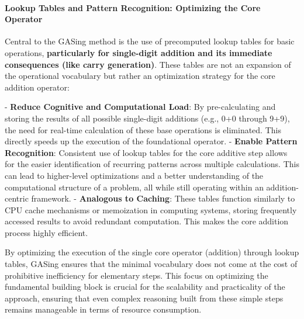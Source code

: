 \paragraph{Lookup Tables and Pattern Recognition: Optimizing the Core Operator}

Central to the GASing method is the use of precomputed lookup tables for basic operations, \textbf{particularly for single-digit addition and its immediate consequences (like carry generation)}. These tables are not an expansion of the operational vocabulary but rather an optimization strategy for the core addition operator:

-   \textbf{Reduce Cognitive and Computational Load}: By pre-calculating and storing the results of all possible single-digit additions (e.g., 0+0 through 9+9), the need for real-time calculation of these base operations is eliminated. This directly speeds up the execution of the foundational operator.
-   \textbf{Enable Pattern Recognition}: Consistent use of lookup tables for the core additive step allows for the easier identification of recurring patterns across multiple calculations. This can lead to higher-level optimizations and a better understanding of the computational structure of a problem, all while still operating within an addition-centric framework.
-   \textbf{Analogous to Caching}: These tables function similarly to CPU cache mechanisms or memoization in computing systems, storing frequently accessed results to avoid redundant computation. This makes the core addition process highly efficient.

By optimizing the execution of the single core operator (addition) through lookup tables, GASing ensures that the minimal vocabulary does not come at the cost of prohibitive inefficiency for elementary steps. This focus on optimizing the fundamental building block is crucial for the scalability and practicality of the approach, ensuring that even complex reasoning built from these simple steps remains manageable in terms of resource consumption.
